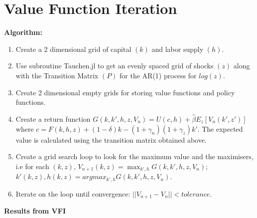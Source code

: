 \documentclass[12pt]{article}
\begin{document}
\section{Value Function Iteration}

\textbf{Algorithm:}\\

\begin{enumerate}
\setlength\itemsep{0em}
\item Create a 2 dimensional grid of capital $(k)$ and labor supply $(h)$.
\item Use subroutine Tauchen.jl to get an evenly spaced grid of shocks $(z)$ along with the Transition Matrix $(P)$ for the AR(1) process for $log(z)$.
\item Create 2 dimensional empty grids for storing value functions and policy functions. 
\item Create a return function $G(k, k', h, z, V_n) = U(c, h) + \hat{\beta}E_z[V_n(k', z')]$ where $c = F(k, h , z) + (1-\delta)k - (1+\gamma_n)(1+\gamma_z)k'$. The expected value is calculated using the transition matrix obtained above.
\item Create a grid search loop to look for the maximum value and the maximisers, i.e for each $(k, z)$, $V_{n+1}(k, z) = \max_{k', h} G(k, k', h, z, V_n)$;   $k'(k, z) , h(k, z) = argmax_{k', h} G(k, k', h, z, V_n)$.
\item Iterate on the loop until convergence: $||V_{n+1} - V_n|| < tolerance$.
\end{enumerate}

\textbf{Results from VFI}
\end{document}
